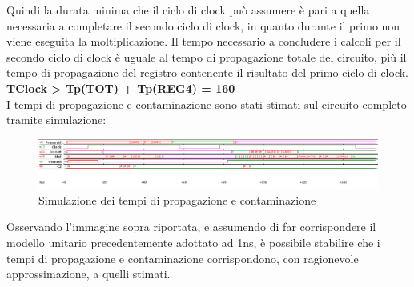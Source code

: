 \documentclass[10pt]{article}
\begin{document}

Quindi la durata minima che il ciclo di clock può assumere è pari a quella necessaria a completare il secondo ciclo di clock, in quanto durante il primo non viene eseguita la moltiplicazione.
Il tempo necessario a concludere i calcoli per il secondo ciclo di clock è uguale al tempo di propagazione totale del circuito, più il tempo di propagazione del registro contenente il risultato
del primo ciclo di clock.\\ 

\textbf{TClock > Tp(TOT) + Tp(REG4) = 160}\\

I tempi di propagazione e contaminazione sono stati stimati sul circuito completo tramite simulazione:

\begin{figure}[ht]
    \begin{minipage}[c]{\textwidth}
    \centering
    \includegraphics[width=\textwidth]{onda}
    \caption{Simulazione dei tempi di propagazione e contaminazione}
    \label{ }
    \end{minipage}
\end{figure}

Osservando l'immagine sopra riportata, e assumendo di far corrispondere il modello unitario precedentemente adottato ad 1ns, è possibile stabilire che i tempi di propagazione e contaminazione corrispondono,
con ragionevole approssimazione, a quelli stimati.
\end{document}
